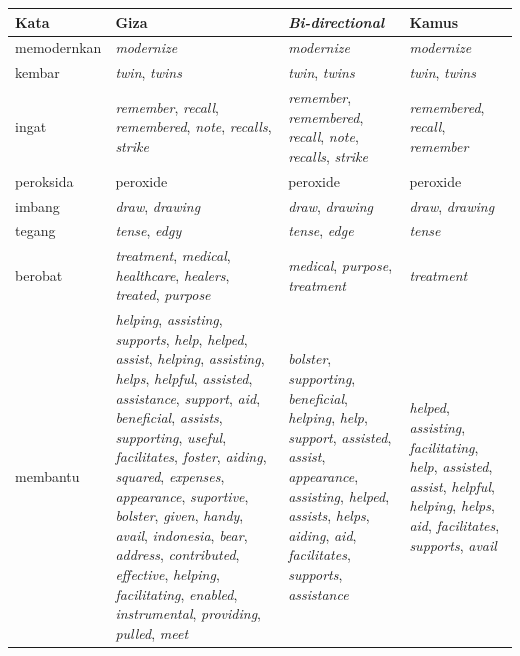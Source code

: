 	\begin{longtable}{|p{3cm}|p{3cm}|p{3cm}|p{3cm}|}
		\hline
		\textbf{Kata} & \textbf{Giza} & \textbf{\textit{Bi-directional}} & \textbf{Kamus}
		\\ \hline
		memodernkan & \textit{modernize} & \textit{modernize} & \textit{modernize} \\ \hline
		kembar & \textit{twin}, \textit{twins} & \textit{twin}, \textit{twins} & \textit{twin}, \textit{twins} \\ \hline
		ingat & \textit{remember}, \textit{recall}, \textit{remembered}, \textit{note}, \textit{recalls}, \textit{strike} & \textit{remember}, \textit{remembered}, \textit{recall}, \textit{note}, \textit{recalls}, \textit{strike} & \textit{remembered}, \textit{recall}, \textit{remember} \\ \hline
		peroksida & peroxide & peroxide & peroxide \\ \hline
		imbang & \textit{draw}, \textit{drawing} & \textit{draw}, \textit{drawing} & \textit{draw}, \textit{drawing} \\ \hline
		tegang & \textit{tense}, \textit{edgy} & \textit{tense}, \textit{edge} & \textit{tense} \\ \hline
		berobat & \textit{treatment}, \textit{medical}, \textit{healthcare}, \textit{healers}, \textit{treated}, \textit{purpose} & \textit{medical}, \textit{purpose}, \textit{treatment} & \textit{treatment} \\ \hline
		membantu & \textit{helping}, \textit{assisting}, \textit{supports}, \textit{help}, \textit{helped}, \textit{assist}, \textit{helping}, \textit{assisting}, \textit{helps}, \textit{helpful}, \textit{assisted}, \textit{assistance}, \textit{support}, \textit{aid}, \textit{beneficial}, \textit{assists}, \textit{supporting}, \textit{useful}, \textit{facilitates}, \textit{foster}, \textit{aiding}, \textit{squared}, \textit{expenses}, \textit{appearance}, \textit{suportive}, \textit{bolster}, \textit{given}, \textit{handy}, \textit{avail}, \textit{indonesia}, \textit{bear}, \textit{address}, \textit{contributed}, \textit{effective}, \textit{helping}, \textit{facilitating}, \textit{enabled}, \textit{instrumental}, \textit{providing}, \textit{pulled}, \textit{meet} & \textit{bolster}, \textit{supporting}, \textit{beneficial}, \textit{helping}, \textit{help}, \textit{support}, \textit{assisted}, \textit{assist}, \textit{appearance}, \textit{assisting}, \textit{helped}, \textit{assists}, \textit{helps}, \textit{aiding}, \textit{aid}, \textit{facilitates}, \textit{supports}, \textit{assistance} & \textit{helped}, \textit{assisting}, \textit{facilitating}, \textit{help}, \textit{assisted}, \textit{assist}, \textit{helpful}, \textit{helping}, \textit{helps}, \textit{aid}, \textit{facilitates}, \textit{supports}, \textit{avail} \\ \hline

\end{longtable}
